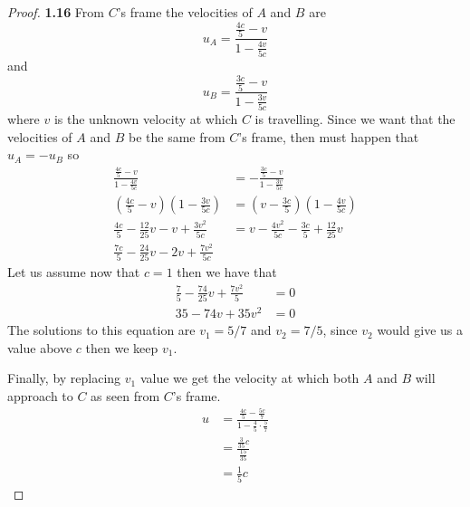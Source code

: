 \documentclass[11pt]{article}
\theoremstyle{definition}
\begin{document}
\cleardoublepage
	\begin{proof}{\textbf{1.16}}
        From $C$'s frame the velocities of $A$ and $B$ are
        $$u_A = \frac{\frac{4c}{5} - v}{1 - \frac{4v}{5c}}$$
        and
        $$u_B = \frac{\frac{3c}{5} - v}{1 - \frac{3v}{5c}}$$
        where $v$ is the unknown velocity at which $C$ is travelling.
        Since we want that the velocities of $A$ and $B$ be the same from $C$'s frame,
        then must happen that $u_A = -u_B$ so
        \begin{align*}
            \frac{\frac{4c}{5} - v}{1 - \frac{4v}{5c}} &= -\frac{\frac{3c}{5} - v}{1 - \frac{3v}{5c}} \\
            (\frac{4c}{5}-v)(1-\frac{3v}{5c}) &= (v - \frac{3c}{5})(1 - \frac{4v}{5c}) \\
            \frac{4c}{5} - \frac{12}{25}v - v + \frac{3v^2}{5c} &= v - \frac{4v^2}{5c} - \frac{3c}{5} + \frac{12}{25}v\\
            \frac{7c}{5}-\frac{24}{25}v - 2v + \frac{7v^2}{5c}
        \end{align*}
        Let us assume now that $c=1$ then we have that
        \begin{align*}
            \frac{7}{5}-\frac{74}{25}v + \frac{7v^2}{5} &= 0\\
            35-74v + 35v^2 &= 0
        \end{align*}
        The solutions to this equation are $v_1 = 5/7$ and $v_2 = 7/5$, since $v_2$
        would give us a value above $c$ then we keep $v_1$.
        
        Finally, by replacing $v_1$ value we get the velocity at which both $A$ and $B$
        will approach to $C$ as seen from $C$'s frame.
        \begin{align*}
            u &= \frac{\frac{4c}{5} -  \frac{5c}{7}}{1 - \frac{4}{5}\cdot \frac{5}{7}}\\
              &= \frac{\frac{3}{35}c}{\frac{15}{35}}\\
              &= \frac{1}{5}c
        \end{align*}
    \end{proof}
\cleardoublepage
\end{document}
